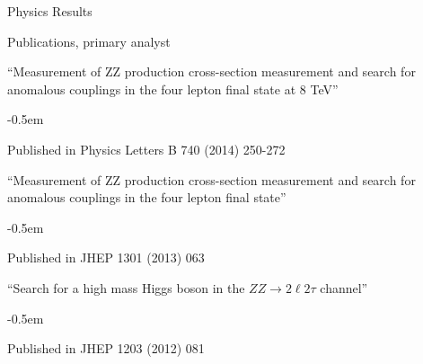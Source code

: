 \documentclass{resume} %
\begin{document}
%
\begin{rSection}{Physics Results}

\begin{rSubsection}{Publications, primary analyst}{}{}{}
\item ``Measurement of ZZ production cross-section measurement and search for
anomalous couplings in the four lepton final state at 8 TeV''
    \begin{list}{}{\leftmargin=1.5em} 
      \itemsep -0.5em \vspace{-0.5em} %
      \item Published in Physics Letters B 740 (2014) 250-272
    \end{list}
\item ``Measurement of ZZ production cross-section measurement and search for
anomalous couplings in the four lepton final state''
    \begin{list}{}{\leftmargin=1.5em} 
      \itemsep -0.5em \vspace{-0.5em} %
      \item Published in JHEP 1301 (2013) 063
    \end{list}
\item ``Search for a high mass Higgs boson in the $ZZ\rightarrow2\ell2\tau$
channel''
    \begin{list}{}{\leftmargin=1.5em} 
      \itemsep -0.5em \vspace{-0.5em} %
      \item Published in JHEP 1203 (2012) 081
    \end{list}
\end{rSubsection}


\end{rSection}
\end{document}
